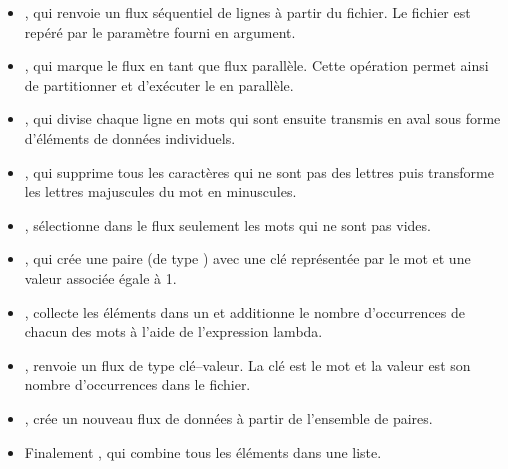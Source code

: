 \begin{itemize}
	\item {}, qui renvoie un flux s\'equentiel de lignes \`a partir du fichier. Le fichier est rep\'er\'e par le param\`etre  fourni en argument.


	\item {}, qui marque le flux en tant que flux parall\`ele. Cette op\'eration permet ainsi de partitionner et d'ex\'ecuter le  en parall\`ele.

	\item {}, qui divise chaque ligne en mots qui sont ensuite transmis en aval sous forme d'\'el\'ements de donn\'ees individuels.
	
	\item {}, qui supprime tous les caract\`eres qui ne sont pas des lettres puis transforme les lettres majuscules du mot en minuscules.
	
	\item {},  s\'electionne dans le flux seulement les mots qui ne sont pas vides.
	
	\item {}, qui cr\'ee une paire (de type ) avec une cl\'e repr\'esent\'ee par le mot et une valeur associ\'ee \'egale \`a 1.
	
	\item {},  collecte les \'el\'ements dans un  et additionne le nombre d'occurrences de chacun des mots \`a l'aide de l'expression lambda.
	
	\item {},  renvoie un flux de type cl\'e--valeur. La cl\'e est le mot et la valeur est son nombre d'occurrences dans le fichier.

	\item {}, cr\'ee un nouveau flux de donn\'ees \`a partir de l'ensemble de paires.
	
	\item Finalement , qui combine tous les \'el\'ements dans une liste.
	
	
\end{itemize}


\section{}
\label{fastflow.sect}

